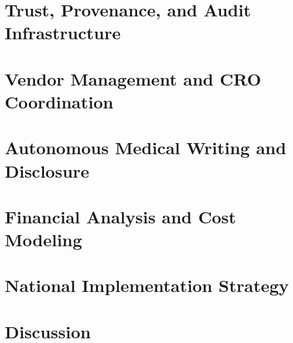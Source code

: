 \documentclass{article}
\begin{document}
\section{Trust, Provenance, and Audit Infrastructure}
\label{sec:trust}

\newpage

\section{Vendor Management and CRO Coordination}
\label{sec:vendor}

\newpage

\section{Autonomous Medical Writing and Disclosure}
\label{sec:writing}

\newpage

\section{Financial Analysis and Cost Modeling}
\label{sec:financial}

\newpage

\section{National Implementation Strategy}
\label{sec:implementation}

\newpage

\section{Discussion}
\label{sec:discussion}

\newpage
\end{document}
